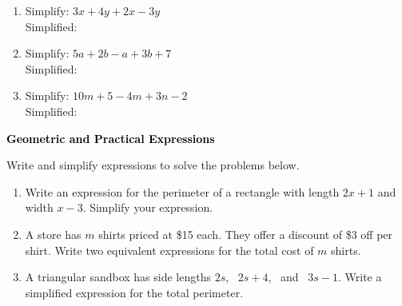 \documentclass[12pt, letterpaper, fleqn]{article}
\newcommand{\blanklong}{\underline{\hspace{6.5cm}}}
\begin{document}
\begin{enumerate}[itemsep=2.2cm, leftmargin=0.6cm]

\item Simplify: $3x + 4y + 2x - 3y$ \\
Simplified: \blanklong

\vspace{2cm}

\item Simplify: $5a + 2b - a + 3b + 7$ \\
Simplified: \blanklong

\vspace{2cm}

\item Simplify: $10m + 5 - 4m + 3n - 2$ \\
Simplified: \blanklong

\vspace{2cm}

\end{enumerate}

\newpage

\begin{tcolorbox}[colback=black!10]
\large\textcolor{black}{\textbf{Geometric and Practical Expressions}}
\end{tcolorbox}

\noindent
Write and simplify expressions to solve the problems below.

\vspace{3mm}

\begin{enumerate}[itemsep=2.2cm, leftmargin=0.6cm]

\item Write an expression for the perimeter of a rectangle with length $2x + 1$ and width $x - 3$. Simplify your expression.

\vspace{2.2cm}

\item A store has $m$ shirts priced at \$15 each. They offer a discount of \$3 off per shirt. Write two equivalent expressions for the total cost of $m$ shirts.

\vspace{2.2cm}

\item A triangular sandbox has side lengths $2s$, \ $2s + 4$, \ and \ $3s - 1$. Write a simplified expression for the total perimeter.

\vspace{2.2cm}

\end{enumerate}
\end{document}
